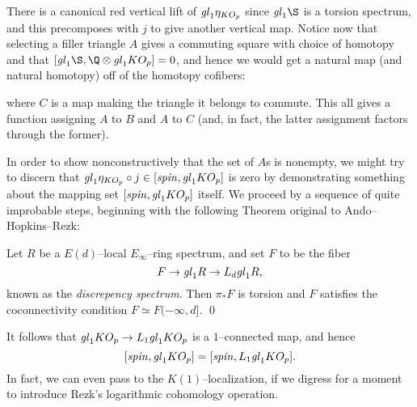 There is a canonical red vertical lift of $\mathit{gl}_1 \eta_{KO_p}$ since $\gl_1 \S$ is a torsion spectrum, and this precomposes with $j$ to give another vertical map.  Notice now that selecting a filler triangle $A$ gives a commuting square with choice of homotopy and that $[\gl_1 \S, \Q \otimes \gl_1 KO_p] = 0$, and hence we would get a natural map (and natural homotopy) off of the homotopy cofibers:
\begin{center}
\end{center}
where $C$ is a map making the triangle it belongs to commute.  This all gives a function assigning $A$ to $B$ and $A$ to $C$ (and, in fact, the latter assignment factors through the former).

In order to show nonconstructively that the set of $A$s is nonempty, we might try to discern that $\mathit{gl}_1 \eta_{KO_p} \circ j \in [\mathit{spin}, \mathit{gl}_1 KO_p]$ is zero by demonstrating something about the mapping set $[\mathit{spin}, \mathit{gl}_1 KO_p]$ itself.  We proceed by a sequence of quite improbable steps, beginning with the following Theorem original to Ando--Hopkins--Rezk:
\begin{theorem}
Let $R$ be a $E(d)$--local $E_\infty$--ring spectrum, and set $F$ to be the fiber \[F \to \mathit{gl}_1 R \to L_d \mathit{gl}_1 R,\] known as the \textit{discrepency spectrum}.  Then $\pi_* F$ is torsion and $F$ satisfies the coconnectivity condition $F \simeq F(-\infty, d]$. \qed
\end{theorem}

\noindent It follows that $\mathit{gl}_1 KO_p \to L_1 \mathit{gl}_1 KO_p$ is a $1$--connected map, and hence \[[\mathit{spin}, \mathit{gl}_1 KO_p] = [\mathit{spin}, L_1 \mathit{gl}_1 KO_p].\]  In fact, we can even pass to the $K(1)$--localization, if we digress for a moment to introduce Rezk's logarithmic cohomology operation.

